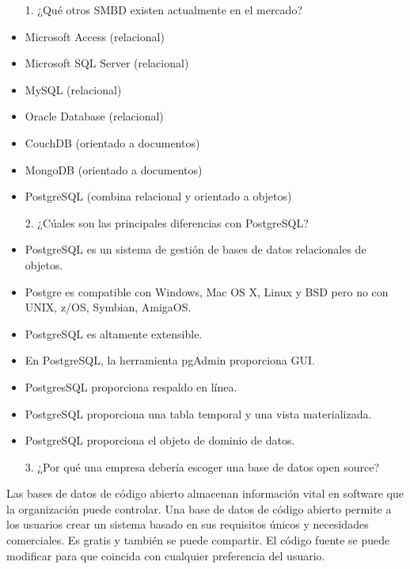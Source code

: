 \documentclass{article}
\begin{document}
\begin{itemize}
    \item[1.]¿Qu\'e otros SMBD existen actualmente en el mercado?
\end{itemize}
\begin{itemize}
    \item Microsoft Access (relacional) 
    \item Microsoft SQL Server (relacional) 
    \item MySQL (relacional) 
    \item Oracle Database (relacional) 
    \item CouchDB (orientado a documentos) 
    \item MongoDB (orientado a documentos) 
    \item PostgreSQL (combina relacional y orientado a objetos) 
\end{itemize}

\begin{itemize}
    \item[2.]¿C\'uales son las principales diferencias con PostgreSQL?
\end{itemize}
\begin{itemize}
    \item PostgreSQL es un sistema de gestión de bases de datos relacionales de objetos. 
    \item Postgre es compatible con Windows, Mac OS X, Linux y BSD pero no con UNIX, z/OS, Symbian, AmigaOS. 
    \item PostgreSQL es altamente extensible. 
    \item En PostgreSQL, la herramienta pgAdmin proporciona GUI. 
    \item PostgresSQL proporciona respaldo en línea. 
    \item PostgreSQL proporciona una tabla temporal y una vista materializada. 
    \item PostgreSQL proporciona el objeto de dominio de datos. 
\end{itemize}
    
\begin{itemize}
    \item[3.]¿Por qu\'e una empresa deber\'ia escoger una base de datos open source?
\end{itemize}
Las bases de datos de código abierto almacenan información vital en software que la organización puede controlar. Una base de datos de código abierto permite a los usuarios crear un sistema basado en sus requisitos únicos y necesidades comerciales. Es gratis y también se puede compartir. El código fuente se puede modificar para que coincida con cualquier preferencia del usuario. 
\end{document}
